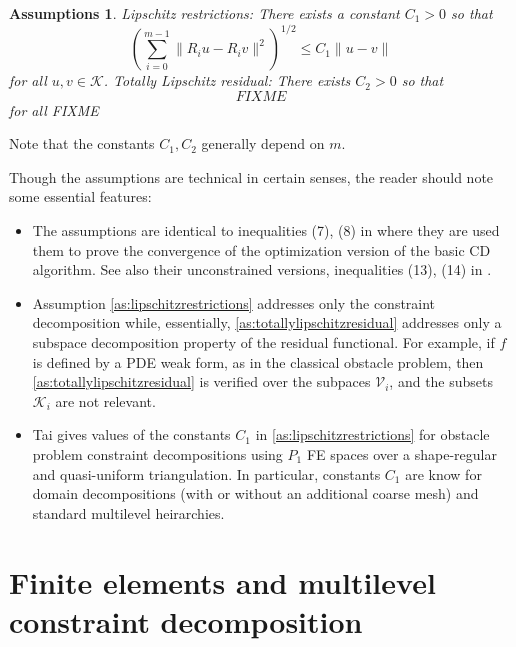 \documentclass[letterpaper,final,12pt,reqno]{amsart}
\theoremstyle{cstyle}
\newtheorem{assumptions}[theorem]{Assumptions}
\theoremstyle{dstyle}
\numberwithin{equation}{section}
\numberwithin{figure}{section}
\numberwithin{table}{section}
\numberwithin{theorem}{section}
\newcommand{\cK}{\mathcal{K}}
\newcommand{\cV}{\mathcal{V}}
\begin{document}
\begin{assumptions}  \emph{Lipschitz restrictions}: There exists a constant $C_1>0$ so that
\begin{equation}
\left(\sum_{i=0}^{m-1} \|R_i u - R_i v\|^2\right)^{1/2} \le C_1 \|u-v\| \label{as:lipschitzrestrictions}
\end{equation}
for all $u,v\in\cK$.  \emph{Totally Lipschitz residual}: There exists $C_2>0$ so that
\begin{equation}
FIXME \label{as:totallylipschitzresidual}
\end{equation}
for all FIXME
\end{assumptions}
Note that the constants $C_1,C_2$ generally depend on $m$.  %

Though the assumptions are technical in certain senses, the reader should note some essential features:
\begin{itemize}
\item The assumptions are identical to inequalities (7), (8) in \cite{Tai2003} where they are used them to prove the convergence of the optimization version of the basic CD algorithm.  See also their unconstrained versions, inequalities (13), (14) in \cite{TaiXu2002}.
\item Assumption \eqref{as:lipschitzrestrictions} addresses only the constraint decomposition while, essentially, \eqref{as:totallylipschitzresidual} addresses only a subspace decomposition property of the residual functional.  For example, if $f$ is defined by a PDE weak form, as in the classical obstacle problem, then \eqref{as:totallylipschitzresidual} is verified over the subpaces $\cV_i$, and the subsets $\cK_i$ are not relevant.
\item Tai \cite{Tai2003} gives values of the constants $C_1$ in \eqref{as:lipschitzrestrictions} for obstacle problem constraint decompositions using $P_1$ FE spaces over a shape-regular and quasi-uniform triangulation.  In particular, constants $C_1$ are know for domain decompositions (with or without an additional coarse mesh) and standard multilevel heirarchies.
\end{itemize}


\section{Finite elements and multilevel constraint decomposition} \label{sec:multilevel}
\end{document}
